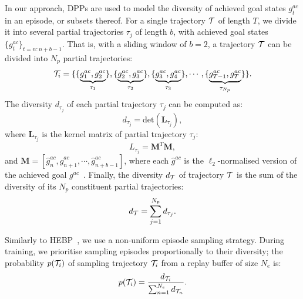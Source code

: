 In our approach, DPPs are used to model the diversity of achieved goal states $g^{ac}_{t}$ in an episode, or subsets thereof. For a single trajectory $\mathcal{T}$ of length $T$, we divide it into several partial trajectories $\tau_{j}$ of length $b$, with achieved goal states $\{g^{ac}_{t}\}_{t=n:n+b-1}$. That is, with a sliding window of $b = 2$, a trajectory $\mathcal{T}$ can be divided into $N_p$ partial trajectories:
\begin{equation}
    \mathcal{T}_{i} = \{\{\underbrace{g^{ac}_{1}, g^{ac}_{2}}_{\tau_{1}}\}, \{\underbrace{g^{ac}_{2}, g^{ac}_{3}}_{\tau_{2}}\}, \{\underbrace{g^{ac}_{3}, g^{ac}_{4}}_{\tau_{3}}\}, \cdots, \{\underbrace{g^{ac}_{T-1}, g^{ac}_{T}}_{\tau_{N_{p}}}\}\}.
\end{equation}
The diversity $d_{\tau_{j}}$ of each partial trajectory $\tau_{j}$ can be computed as:
\begin{equation}
    d_{\tau_{j}} = \text{det}(\mathbf{L}_{\tau_{j}}), 
\label{eq:partial_div}
\end{equation}
where $\mathbf{L}_{\tau_{j}}$ is the kernel matrix of partial trajectory $\tau_{j}$:
\begin{equation}
    L_{\tau_{j}} = \mathbf{M}^{T}\mathbf{M},
\end{equation}
and $\mathbf{M}=[\hat{g}^{ac}_{n}, \hat{g}^{ac}_{n+1}, \cdots, \hat{g}^{ac}_{n+b-1}]$, where each $\hat{g}^{ac}$ is the $\ell_2$-normalised version of the achieved goal $g^{ac}$~\cite{kulesza2011k}. Finally, the diversity $d_{\mathcal{T}}$ of trajectory $\mathcal{T}$ is the sum of the diversity of its $N_p$ constituent partial trajectories:
\begin{equation}
    d_{\mathcal{T}} = \sum_{j=1}^{N_{p}} d_{\tau_{j}}.
\label{eq:total_div}
\end{equation}

Similarly to HEBP~\cite{zhao2018energy}, we use a non-uniform episode sampling strategy. During training, we prioritise sampling episodes proportionally to their diversity; the probability $p(\mathcal{T}_{i})$ of sampling trajectory $\mathcal{T}_{i}$ from a replay buffer of size $N_{e}$ is:
\begin{equation}
    p(\mathcal{T}_{i}) = \frac{d_{\mathcal{T}_{i}}}{\sum_{n=1}^{N_{e}} d_{\mathcal{T}_{n}}}.
\label{eq:diversity_priority}
\end{equation}


